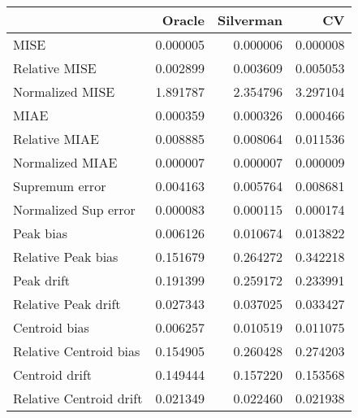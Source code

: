 \begin{tabular}{lrrr}
  \toprule
 & Oracle & Silverman & CV \\ 
  \midrule
MISE & 0.000005 & 0.000006 & 0.000008 \\ 
  Relative MISE & 0.002899 & 0.003609 & 0.005053 \\ 
  Normalized MISE & 1.891787 & 2.354796 & 3.297104 \\ 
  MIAE & 0.000359 & 0.000326 & 0.000466 \\ 
  Relative MIAE & 0.008885 & 0.008064 & 0.011536 \\ 
  Normalized MIAE & 0.000007 & 0.000007 & 0.000009 \\ 
  Supremum error & 0.004163 & 0.005764 & 0.008681 \\ 
  Normalized Sup error & 0.000083 & 0.000115 & 0.000174 \\ 
  Peak bias & 0.006126 & 0.010674 & 0.013822 \\ 
  Relative Peak bias & 0.151679 & 0.264272 & 0.342218 \\ 
  Peak drift & 0.191399 & 0.259172 & 0.233991 \\ 
  Relative Peak drift & 0.027343 & 0.037025 & 0.033427 \\ 
  Centroid bias & 0.006257 & 0.010519 & 0.011075 \\ 
  Relative Centroid bias & 0.154905 & 0.260428 & 0.274203 \\ 
  Centroid drift & 0.149444 & 0.157220 & 0.153568 \\ 
  Relative Centroid drift & 0.021349 & 0.022460 & 0.021938 \\ 
   \bottomrule
\end{tabular}
